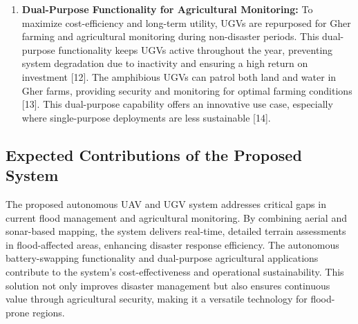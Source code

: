 \documentclass[conference]{IEEEtran}
\begin{document}
\begin{enumerate}
	\item \textbf{Dual-Purpose Functionality for Agricultural Monitoring:}
To maximize cost-efficiency and long-term utility, UGVs are repurposed for Gher farming and agricultural monitoring during non-disaster periods. This dual-purpose functionality keeps UGVs active throughout the year, preventing system degradation due to inactivity and ensuring a high return on investment [12]. The amphibious UGVs can patrol both land and water in Gher farms, providing security and monitoring for optimal farming conditions [13]. This dual-purpose capability offers an innovative use case, especially where single-purpose deployments are less sustainable [14].	
	
\end{enumerate}


\subsection{\textbf{Expected Contributions of the Proposed System}}
The proposed autonomous UAV and UGV system addresses critical gaps in current flood management and agricultural monitoring. By combining aerial and sonar-based mapping, the system delivers real-time, detailed terrain assessments in flood-affected areas, enhancing disaster response efficiency. The autonomous battery-swapping functionality and dual-purpose agricultural applications contribute to the system’s cost-effectiveness and operational sustainability. This solution not only improves disaster management but also ensures continuous value through agricultural security, making it a versatile technology for flood-prone regions.
\end{document}
